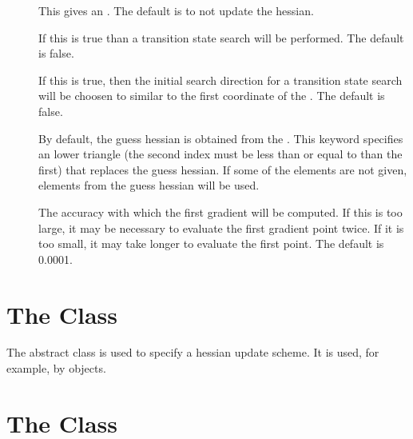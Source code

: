 \begin{description}
  \item[] This gives an 
     .  The default is to not update the
     hessian.

  \item[] If this is true than a transition
     state search will be performed. The default is false.

  \item[] If this is true, then the initial search
     direction for a transition state search will be choosen to similar to
     the first coordinate of the .  The default is
     false.

  \item[] By default, the guess hessian is obtained from the
      .  This keyword
     specifies an lower triangle  (the second
     index must be less than or equal to than the first) that replaces the
     guess hessian.  If some of the elements are not given, elements from
     the guess hessian will be used.

  \item[] The accuracy with which the first gradient will
     be computed.  If this is too large, it may be necessary to evaluate
     the first gradient point twice.  If it is too small, it may take
     longer to evaluate the first point. The default is 0.0001.

\end{description}


\section{The  Class}\label{HessianUpdate}

The  abstract class is used to specify a
hessian update scheme.  It is used, for example, by
 objects.


\section{The  Class}\label{DFPUpdate}

